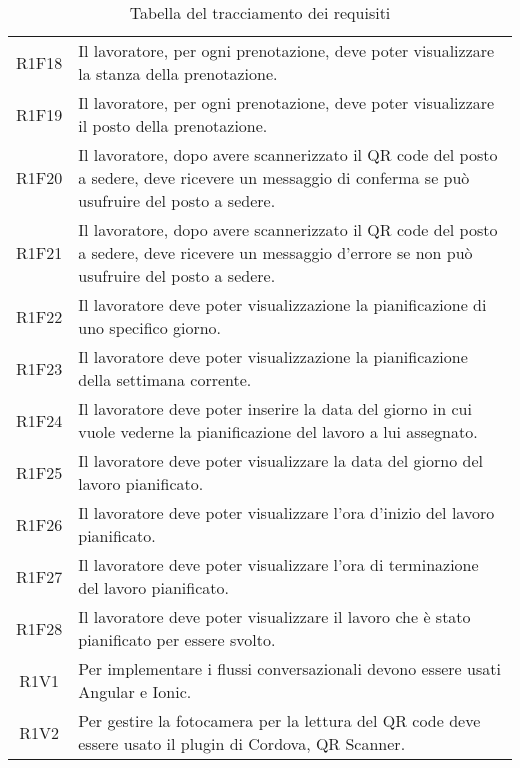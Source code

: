 \begin{table}[h]%
	\centering
	\begin{tabularx}{\textwidth}{c X}
		\hline		
		\rowcolor{giallo}
		\intest{Codice} &  \intest{Descrizione} \\	
		\hline	
		R1F18 & Il lavoratore, per ogni prenotazione, deve poter visualizzare la stanza della prenotazione.\\
		R1F19 & Il lavoratore, per ogni prenotazione, deve poter visualizzare il posto della prenotazione.\\	
		R1F20 & Il lavoratore, dopo avere scannerizzato il QR code del posto a sedere, deve ricevere un messaggio di conferma se può usufruire del posto a sedere.\\
		R1F21 & Il lavoratore, dopo avere scannerizzato il QR code del posto a sedere, deve ricevere un messaggio d'errore se non può usufruire del posto a sedere.\\
		R1F22 & Il lavoratore deve poter visualizzazione la pianificazione di uno specifico giorno.\\
		R1F23 & Il lavoratore deve poter visualizzazione la pianificazione della settimana corrente.\\
		R1F24 & Il lavoratore deve poter inserire la data del giorno in cui vuole vederne la pianificazione del lavoro a lui assegnato.\\
		R1F25 & Il lavoratore deve poter visualizzare la data del giorno del lavoro pianificato.\\
		R1F26 & Il lavoratore deve poter visualizzare l'ora d'inizio del lavoro pianificato.\\
		R1F27 & Il lavoratore deve poter visualizzare l'ora di terminazione del lavoro pianificato.\\
		R1F28 & Il lavoratore deve poter visualizzare il lavoro che è stato pianificato per essere svolto.\\
		R1V1 & Per implementare i flussi conversazionali devono essere usati Angular e Ionic.\\
		R1V2 & Per gestire la fotocamera per la lettura del QR code deve essere usato il plugin di Cordova, QR Scanner.\\
		
		\hline	
	\end{tabularx} \hbox{}
	\caption{Tabella del tracciamento dei requisiti}
\end{table}%
